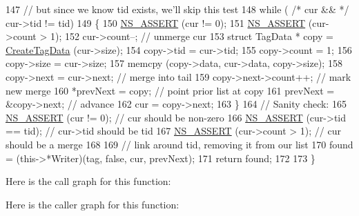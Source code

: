 \begin{DoxyCode}
147   \textcolor{comment}{// but since we know tid exists, we'll skip this test}
148   \textcolor{keywordflow}{while} ( \textcolor{comment}{/* cur && */} cur->tid != tid)
149     \{
150       \hyperlink{assert_8h_a6dccdb0de9b252f60088ce281c49d052}{NS\_ASSERT} (cur != 0);
151       \hyperlink{assert_8h_a6dccdb0de9b252f60088ce281c49d052}{NS\_ASSERT} (cur->count > 1);
152       cur->count--;                       \textcolor{comment}{// unmerge cur}
153       \textcolor{keyword}{struct }TagData * copy = \hyperlink{classns3_1_1PacketTagList_abfab9cfb3a21336e2f7962cc51fcff94}{CreateTagData} (cur->size);
154       copy->tid = cur->tid;
155       copy->count = 1;
156       copy->size = cur->size;
157       memcpy (copy->data, cur->data, copy->size);
158       copy->next = cur->next;             \textcolor{comment}{// merge into tail}
159       copy->next->count++;                \textcolor{comment}{// mark new merge}
160       *prevNext = copy;                   \textcolor{comment}{// point prior list at copy}
161       prevNext = &copy->next;             \textcolor{comment}{// advance}
162       cur      =  copy->next;
163     \}
164   \textcolor{comment}{// Sanity check:}
165   \hyperlink{assert_8h_a6dccdb0de9b252f60088ce281c49d052}{NS\_ASSERT} (cur != 0);                 \textcolor{comment}{// cur should be non-zero}
166   \hyperlink{assert_8h_a6dccdb0de9b252f60088ce281c49d052}{NS\_ASSERT} (cur->tid == tid);          \textcolor{comment}{// cur->tid should be tid}
167   \hyperlink{assert_8h_a6dccdb0de9b252f60088ce281c49d052}{NS\_ASSERT} (cur->count > 1);           \textcolor{comment}{// cur should be a merge}
168 
169   \textcolor{comment}{// link around tid, removing it from our list}
170   found = (this->*Writer)(tag, \textcolor{keyword}{false}, cur, prevNext);
171   \textcolor{keywordflow}{return} found;
172 
173 \}
\end{DoxyCode}


Here is the call graph for this function\+:




Here is the caller graph for this function\+:


